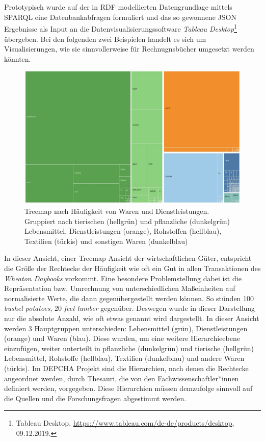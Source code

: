 \documentclass[12pt,a4paper]{article}
\begin{document}
\\
\\
Prototypisch wurde auf der in RDF modellierten Datengrundlage mittels SPARQL eine Datenbankabfragen formuliert und das so gewonnene JSON Ergebnisse als Input an die Datenvisualisierungssoftware \textit{Tableau Desktop}\footnote{Tableau Desktop, \url{https://www.tableau.com/de-de/products/desktop}, 09.12.2019.} übergeben. Bei den folgenden zwei Beispielen handelt es sich um Visualisierungen, wie sie sinnvollerweise für Rechnugnsbücher umgesetzt werden könnten.
\begin{figure}[H]
\centering
	\includegraphics[width=1\textwidth]{img/infovis1.jpg}  
    \caption[Treemap nach Häufigkeit von Waren und Dienstleistungen. Gruppiert nach tierischen (hellgrün) und pflanzliche (dunkelgrün) Lebensmittel, Dienstleistungen (orange), Rohstoffen (hellblau), Textilien (türkis) und sonstigen Waren (dunkelblau), eigene Darstellung, erstellt mit Tableau Desktop]{Treemap nach Häufigkeit von Waren und Dienstleistungen. Gruppiert nach tierischen (hellgrün) und pflanzliche (dunkelgrün) Lebensmittel, Dienstleistungen (orange), Rohstoffen (hellblau), Textilien (türkis) und sonstigen Waren (dunkelblau)} \label{fig:InfoVis1}
\end{figure}
In dieser Ansicht, einer Treemap Ansicht der wirtschaftlichen Güter, entspricht die Größe der Rechtecke der Häufigkeit wie oft ein Gut in allen Transaktionen des \textit{Wheaton Daybooks} vorkommt. Eine besondere Problemstellung dabei ist die Repräsentation bzw. Umrechnung von unterschiedlichen Maßeinheiten auf normalisierte Werte, die dann gegenübergestellt werden können. So stünden 100 \textit{bushel potatoes}, 20 \textit{feet lumber} gegenüber. Deswegen wurde in dieser Darstellung nur die absolute Anzahl, wie oft etwas genannt wird dargestellt. In dieser Ansicht werden 3 Hauptgruppen unterschieden: Lebensmittel (grün), Dienstleistungen (orange) und Waren (blau). Diese wurden, um eine weitere Hierarchieebene einzufügen, weiter unterteilt in pflanzliche (dunkelgrün) und tierische (hellgrün) Lebensmittel, Rohstoffe (hellblau), Textilien (dunkelblau) und andere Waren (türkis). Im DEPCHA Projekt sind die Hierarchien, nach denen die Rechtecke angeordnet werden, durch Thesauri, die von den Fachwissenschaftler*innen definiert werden, vorgegeben. Diese Hierarchien müssen demzufolge sinnvoll auf die Quellen und die Forschungsfragen abgestimmt werden.
\end{document}
